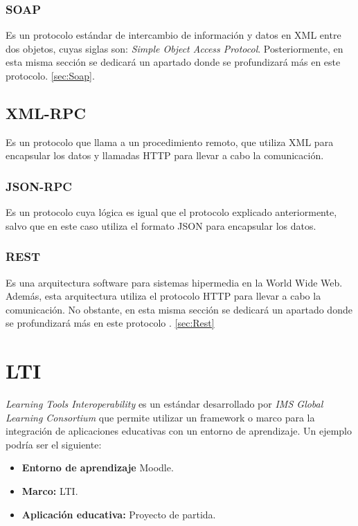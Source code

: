 \subsubsection{SOAP}

Es un protocolo estándar de intercambio de información y datos en XML entre dos objetos, cuyas siglas son: \emph{Simple Object Access Protocol}. Posteriormente, en esta misma sección se dedicará un apartado donde se profundizará más en este protocolo.  \ref{sec:Soap}.

\subsection{XML-RPC}

Es un protocolo que llama a un procedimiento remoto, que utiliza XML para encapsular los datos y llamadas HTTP para llevar a cabo la comunicación.

\subsubsection{JSON-RPC}

Es un protocolo cuya lógica es igual que el protocolo explicado anteriormente, salvo que en este caso utiliza el formato JSON para encapsular los datos.

\subsubsection{REST}

Es una arquitectura software para sistemas hipermedia en la World Wide Web. Además, esta arquitectura utiliza el protocolo HTTP para llevar a cabo la comunicación. No obstante, en esta misma sección se dedicará un apartado donde se profundizará más en este protocolo \cite{wiki:rest}. \ref{sec:Rest}


\section{LTI}

\emph{Learning Tools Interoperability} es un estándar desarrollado por \emph{IMS Global Learning Consortium} que permite utilizar un framework o marco para la integración de aplicaciones educativas con un entorno de aprendizaje.
Un ejemplo podría ser el siguiente:

\begin{itemize}
	\item \textbf{Entorno de aprendizaje} Moodle.
	\item \textbf{Marco:} LTI.
	\item \textbf{Aplicación educativa:} Proyecto de partida.
\end{itemize}

